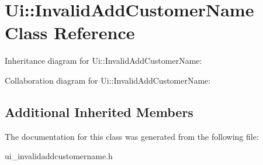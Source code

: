 \section{Ui\+:\+:Invalid\+Add\+Customer\+Name Class Reference}
\label{class_ui_1_1_invalid_add_customer_name}


Inheritance diagram for Ui\+:\+:Invalid\+Add\+Customer\+Name\+:


Collaboration diagram for Ui\+:\+:Invalid\+Add\+Customer\+Name\+:
\subsection*{Additional Inherited Members}


The documentation for this class was generated from the following file\+:\begin{DoxyCompactItemize}
\item 
ui\+\_\+invalidaddcustomername.\+h\end{DoxyCompactItemize}
